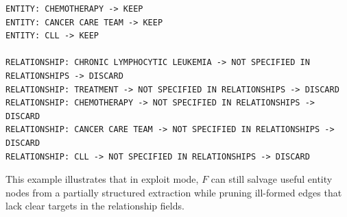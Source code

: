 \begin{Verbatim}[fontsize=\footnotesize, breaklines=true, breakanywhere=true, breaksymbolleft={}]
ENTITY: CHEMOTHERAPY -> KEEP
ENTITY: CANCER CARE TEAM -> KEEP
ENTITY: CLL -> KEEP

RELATIONSHIP: CHRONIC LYMPHOCYTIC LEUKEMIA -> NOT SPECIFIED IN RELATIONSHIPS -> DISCARD
RELATIONSHIP: TREATMENT -> NOT SPECIFIED IN RELATIONSHIPS -> DISCARD
RELATIONSHIP: CHEMOTHERAPY -> NOT SPECIFIED IN RELATIONSHIPS -> DISCARD
RELATIONSHIP: CANCER CARE TEAM -> NOT SPECIFIED IN RELATIONSHIPS -> DISCARD
RELATIONSHIP: CLL -> NOT SPECIFIED IN RELATIONSHIPS -> DISCARD
\end{Verbatim}

This example illustrates that in \textsf{exploit} mode, $F$ can still salvage useful entity nodes from a partially structured extraction while pruning ill-formed edges that lack clear targets in the relationship fields.


